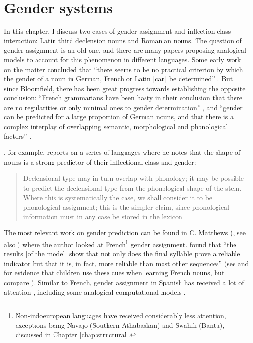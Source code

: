 \chapter{Gender systems}\label{chap:gender-assignment}

In this chapter, I discuss two cases of gender assignment and inflection class interaction: Latin third declension nouns and Romanian nouns. The question of gender assignment is an old one, and there are many papers proposing analogical models to account for this phenomenon in different languages. Some early work on the matter concluded that ``there seems to be no practical criterion by which the gender of a noun in German, French or Latin [can] be determined'' \autocite[280]{Bloomfield.1933a}. But since Bloomfield, there has been great progress towards establishing the opposite conclusion: ``French  grammarians  have  been  hasty  in  their  conclusion  that there are no regularities or only minimal ones to gender determination'' \autocite[316]{Tucker.1968}, and ``gender can be predicted for a large proportion of German nouns, and that there is a complex interplay of overlapping semantic, morphological and phonological factors'' \autocite[49]{Corbett.1991}.

\textcite{Corbett.1991}, for example, reports on a series of languages where he notes that the shape of nouns is a strong predictor of their inflectional class and gender:

\begin{quotation}
Declensional type may in turn overlap with phonology; it may be possible to predict the declensional type from the phonological shape of the stem. Where this is systematically the case, we shall consider it to be phonological assignment; this is the simpler claim, since phonological information must in any case be stored in the lexicon \autocite[34]{Corbett.1991}
\end{quotation}

The most relevant work on gender prediction can be found in C. Matthews (, see also \citealt{Lyster.2006}) where the author looked at French\footnote{Non-indoeuropean languages have received considerably less attention, exceptions being Navajo (Southern Athabaskan) \autocites{Eddington.2006, McDonough.2013} and Swahili (Bantu), discussed in Chapter \ref{chap:structural}.} gender assignment. \textcite[879]{Matthews.2010} found that ``the results [of the model] show that not only does the final syllable prove a reliable indicator but that it is, in fact, more reliable than most other sequences'' (see \textcite{Marchal.2007} and \textcite{Seigneuric.2007} for evidence that children use these cues when learning French nouns, but compare \textcite{Boloh.2010}). Similar to French, gender assignment in Spanish has received a lot of attention \autocite{Morin.2006, Sanchez.1995, Smead.2000}, including some analogical computational models \autocite{Eddington.2002}.

